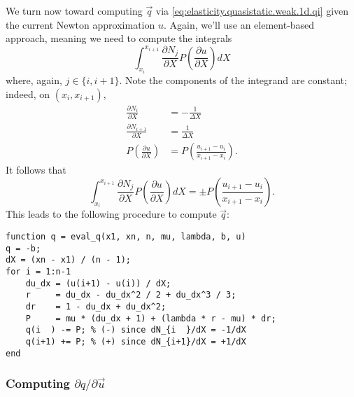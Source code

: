 We turn now toward computing $\vec{q}$ via \eqref{eq:elasticity.quasistatic.weak.1d.qi} given the current Newton approximation $u$. Again, we'll use an element-based approach, meaning we need to compute the integrals
\begin{equation*}
\int_{x_i}^{x_{i+1}} \frac{\partial N_j}{\partial X} P \left( \frac{\partial u}{\partial X} \right) dX
\end{equation*}
where, again, $j \in \{i, i+1\}$. Note the components of the integrand are constant; indeed, on $\left( x_i, x_{i+1} \right)$,
\begin{align*}
\frac{\partial N_i}{\partial X} & = -\frac{1}{\Delta X} \\
\frac{\partial N_{i+1}}{\partial X} & = \frac{1}{\Delta X} \\
P \left( \frac{\partial u}{\partial X} \right) & = P \left( \frac{u_{i+1} - u_i}{x_{i+1} - x_i} \right).
\end{align*}
It follows that
\begin{equation*}
\int_{x_i}^{x_{i+1}} \frac{\partial N_j}{\partial X} P \left( \frac{\partial u}{\partial X} \right) dX = \pm P \left( \frac{u_{i+1} - u_i}{x_{i+1} - x_i} \right).
\end{equation*}
This leads to the following procedure to compute $\vec{q}$:
\begin{verbatim}
function q = eval_q(x1, xn, n, mu, lambda, b, u)
q = -b;
dX = (xn - x1) / (n - 1);
for i = 1:n-1
    du_dx = (u(i+1) - u(i)) / dX;
    r     = du_dx - du_dx^2 / 2 + du_dx^3 / 3;
    dr    = 1 - du_dx + du_dx^2;
    P     = mu * (du_dx + 1) + (lambda * r - mu) * dr;
    q(i  ) -= P; % (-) since dN_{i  }/dX = -1/dX
    q(i+1) += P; % (+) since dN_{i+1}/dX = +1/dX
end
\end{verbatim}

\subsubsection{Computing $\partial q/\partial\vec{u}$}

